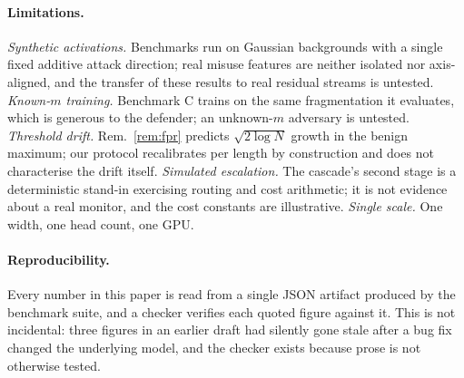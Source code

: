 \documentclass[10pt]{article}
\theoremstyle{plain}
\theoremstyle{definition}
\theoremstyle{remark}
\begin{document}
\paragraph{Limitations.}
\emph{Synthetic activations.} Benchmarks run on Gaussian backgrounds with a single fixed
additive attack direction; real misuse features are neither isolated nor axis-aligned, and
the transfer of these results to real residual streams is untested.
\emph{Known-$m$ training.} Benchmark C trains on the same fragmentation it evaluates,
which is generous to the defender; an unknown-$m$ adversary is untested.
\emph{Threshold drift.} Rem.~\ref{rem:fpr} predicts $\sqrt{2\log N}$ growth in the benign
maximum; our protocol recalibrates per length by construction and does not characterise
the drift itself.
\emph{Simulated escalation.} The cascade's second stage is a deterministic stand-in
exercising routing and cost arithmetic; it is not evidence about a real monitor, and the
cost constants are illustrative.
\emph{Single scale.} One width, one head count, one GPU.

\paragraph{Reproducibility.}
Every number in this paper is read from a single JSON artifact produced by the benchmark
suite, and a checker verifies each quoted figure against it. This is not incidental: three
figures in an earlier draft had silently gone stale after a bug fix changed the underlying
model, and the checker exists because prose is not otherwise tested.



\end{document}
